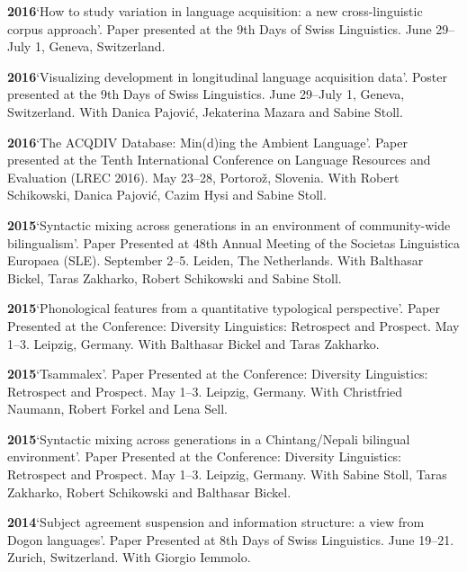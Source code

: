 \documentclass[11pt]{article}
\newcommand{\hangpara}{
 \setlength{\parindent}{0in} %
 \hangindent=0.42in %
}
\begin{document}
\vskip 6pt
\hangpara
{\bf 2016}\hspace{1ex}`How to study variation in language acquisition: a new cross-linguistic corpus approach'. Paper presented at the 9th Days of Swiss Linguistics. June 29--July 1, Geneva, Switzerland.

\vskip 6pt
\hangpara
{\bf 2016}\hspace{1ex}`Visualizing development in longitudinal language acquisition data'. Poster presented at the 9th Days of Swiss Linguistics. June 29--July 1, Geneva, Switzerland. With Danica Pajovi{\'c}, Jekaterina Mazara and Sabine Stoll.

\vskip 6pt
\hangpara
{\bf 2016}\hspace{1ex}`The ACQDIV Database: Min(d)ing the Ambient Language'. Paper presented at the Tenth International Conference on Language Resources and Evaluation (LREC 2016). May 23--28, Portoro{\v z}, Slovenia. With Robert Schikowski, Danica Pajovi{\'c}, Cazim Hysi and Sabine Stoll.

\vskip 6pt
\hangpara
{\bf 2015}\hspace{1ex}`Syntactic mixing across generations in an environment of community-wide bilingualism'. Paper Presented at 48th Annual Meeting of the Societas Linguistica Europaea (SLE). September 2--5. Leiden, The Netherlands. With Balthasar Bickel, Taras Zakharko, Robert Schikowski and Sabine Stoll.

\vskip 6pt
\hangpara
{\bf 2015}\hspace{1ex}`Phonological features from a quantitative typological perspective'. Paper Presented at the Conference: Diversity Linguistics: Retrospect and Prospect. May 1--3. Leipzig, Germany. With Balthasar Bickel and Taras Zakharko.

\vskip 6pt
\hangpara
{\bf 2015}\hspace{1ex}`Tsammalex'. Paper Presented at the Conference: Diversity Linguistics: Retrospect and Prospect. May 1--3. Leipzig, Germany. With Christfried Naumann, Robert Forkel and Lena Sell.

\vskip 6pt
\hangpara
{\bf 2015}\hspace{1ex}`Syntactic mixing across generations in a Chintang/Nepali bilingual environment'. Paper Presented at the Conference: Diversity Linguistics: Retrospect and Prospect. May 1--3. Leipzig, Germany. With Sabine Stoll, Taras Zakharko, Robert Schikowski and Balthasar Bickel.

\vskip 6pt
\hangpara
{\bf 2014}\hspace{1ex}`Subject agreement suspension and information structure: a view from Dogon languages'. Paper Presented at 8th Days of Swiss Linguistics. June 19--21. Zurich, Switzerland. With Giorgio Iemmolo.
\end{document}
